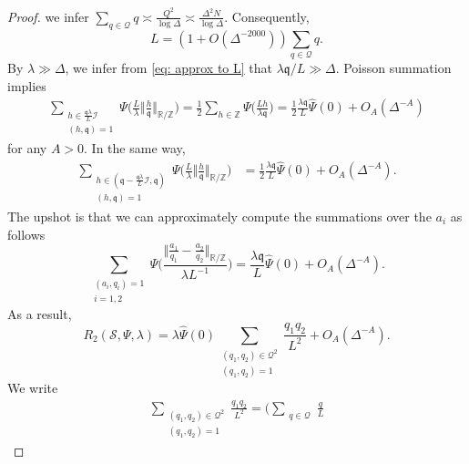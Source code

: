 \documentclass[12pt,reqno]{amsart}
\theoremstyle{plain}
\numberwithin{equation}{section}
\numberwithin{figure}{section}
\theoremstyle{plain}
\theoremstyle{definition}
\theoremstyle{remark}
\begin{document}
\begin{proof}
we infer 
$\sum_{q\in \mathcal{Q}}  q \asymp \frac{Q^2}{\log \Delta}
\asymp \frac{\Delta^2 N}{\log \Delta} $.
Consequently,
\begin{equation}\label{eq: approx to L}
L= (1+ O(\Delta^{-2000})) \sum_{q\in \mathcal{Q}}  q.
\end{equation}
By $\lambda \gg \Delta$, we infer from
\eqref{eq: approx to L} that
$\lambda \mathfrak{q}/L\gg \Delta$.
Poisson summation implies
\begin{align*}
\sum_{\substack{h\in \frac{\mathfrak{q} \lambda}{L}\mathcal{I}\\
(h,\mathfrak{q})=1}}
\Psi\Big( \frac{L}{\lambda}\Big \Vert  
\frac{h}{\mathfrak{q}} \Big\Vert_{\mathbb{R}/\mathbb{Z}}\Big)
= 
\frac{1}{2}
\sum_{h\in \mathbb{Z}}
\Psi\Big(\frac{Lh}{\lambda\mathfrak{q}} \Big)
= \frac{1}{2} 
\frac{\lambda\mathfrak{q}}{L}
\widehat{\Psi}(0)
+ O_A(\Delta^{-A})
\end{align*}
for any $A>0$.
In the same way,
\begin{align*}
\sum_{\substack{h\in (\mathfrak{q}- 
\frac{\mathfrak{q} \lambda}{L}\mathcal{I}, \mathfrak{q})\\
(h,\mathfrak{q})=1}}
\Psi\Big(\frac{L}{\lambda} \Big \Vert  
\frac{h}{\mathfrak{q}} \Big\Vert_{\mathbb{R}/\mathbb{Z}}\Big)
& = \frac{1}{2} 
\frac{\lambda\mathfrak{q}}{L}
\widehat{\Psi}(0)
+ O_A(\Delta^{-A}).
\end{align*}
The upshot is that we can approximately compute the summations over the 
$a_i$ as follows
$$
\sum_{\substack{(a_i,q_i)=1\\
i=1,2}} 
\Psi\Bigg(\frac{\big \Vert \frac{a_1}{q_1} - 
\frac{a_2}{q_2} \big\Vert_{\mathbb{R}/\mathbb{Z}}}
{\lambda L^{-1}}\Bigg) = 
\frac{\lambda \mathfrak{q}}{L} \widehat{\Psi}(0) + O_A(\Delta^{-A}).
$$
As a result, 
\begin{equation}\label{eq circle method interm}
R_2(\mathcal{S},\Psi,\lambda)
= 
\lambda \widehat{\Psi}(0) 
\sum_{\substack{(q_1,q_2)\in \mathcal{Q}^2\\
(q_1,q_2)=1}}
\frac{q_1q_2}{L^2} + O_A(\Delta^{-A}).
\end{equation}
We write
\begin{align}\label{eq interm q sum}
\sum_{\substack{(q_1,q_2)\in \mathcal{Q}^2\\
(q_1,q_2)=1}} \frac{q_1q_2}{L^2}
= 
\Bigg(
\sum_{\substack{q\in \mathcal{Q}}} \frac{q}{L}

\end{align}
\end{proof}
\end{document}
